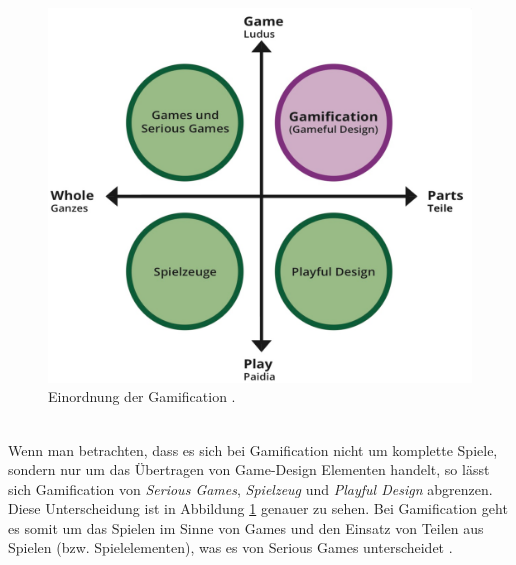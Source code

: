\documentclass[a4paper,12pt]{scrartcl}
\begin{document}
\\
\begin{figure}[h!]
\begin{center}
\includegraphics[scale = 0.4]{Bilder/PlayGame.eps}
\caption{Einordnung der Gamification \cite{PlayGame2018}.}
\label{PlayGameBild}
\end{center}
\end{figure}
\\
Wenn man betrachten, dass es sich bei Gamification nicht um komplette Spiele, sondern nur um das Übertragen von Game-Design Elementen handelt, so lässt sich Gamification von \textit{Serious Games}, \textit{Spielzeug} und \textit{Playful Design} abgrenzen. Diese Unterscheidung ist in Abbildung \ref{PlayGameBild} genauer zu sehen. Bei Gamification geht es somit um das Spielen im Sinne von Games und den Einsatz von Teilen aus Spielen (bzw. Spielelementen), was es von Serious Games unterscheidet \cite{PlayGame2018}.
\end{document}

